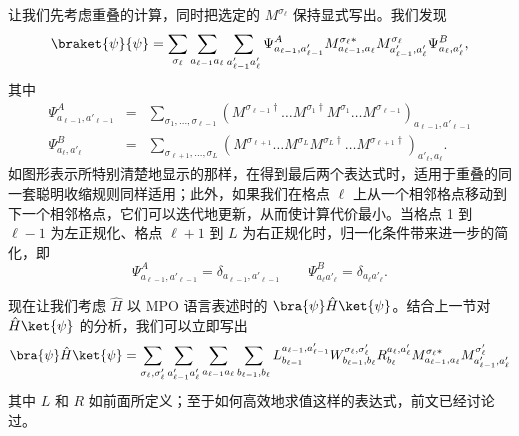 让我们先考虑重叠的计算，同时把选定的 $M^{\sigma_\ell}$ 保持显式写出。我们发现
\begin{equation}
\braket{\psi}{\psi} = \sum_{\sigma_\ell} \sum_{a_{\ell-1}a_{\ell}} \sum_{a'_{\ell-1}a'_{\ell}} \Psi^A_{a_{\ell-1},a'_{\ell-1}} M^{\sigma_\ell*}_{a_{\ell-1}, a_{\ell}} M^{\sigma_\ell}_{a'_{\ell-1}, a'_{\ell}} \Psi^B_{a_\ell, a_\ell'},
\end{equation}
其中
\begin{eqnarray}
\Psi^A_{a_{\ell-1},a'_{\ell-1}} &=& \sum_{\sigma_1,\ldots,\sigma_{\ell-1}} (M^{\sigma_{\ell-1}\dagger} \ldots M^{\sigma_1\dagger} M^{\sigma_1} \ldots M^{\sigma_{\ell-1}})_{a_{\ell-1},a'_{\ell-1}} \\
\Psi^B_{a_\ell, a'_\ell} &=& \sum_{\sigma_{\ell+1},\ldots,\sigma_L} (M^{\sigma_{\ell+1}} \ldots M^{\sigma_L} M^{\sigma_L\dagger} \ldots M^{\sigma_{\ell+1}\dagger})_{a'_\ell,a_\ell} .
\end{eqnarray}
如图形表示所特别清楚地显示的那样，在得到最后两个表达式时，适用于重叠的同一套聪明收缩规则同样适用；此外，如果我们在格点 $\ell$ 上从一个相邻格点移动到下一个相邻格点，它们可以迭代地更新，从而使计算代价最小。当格点 1 到 $\ell-1$ 为左正规化、格点 $\ell+1$ 到 $L$ 为右正规化时，归一化条件带来进一步的简化，即
\begin{equation} 
\Psi^A_{a_{\ell-1},a'_{\ell-1}} = \delta_{a_{\ell-1},a'_{\ell-1}} \quad\quad  \Psi^B_{a_\ell a'_\ell} = \delta_{a_\ell a'_\ell} .
\end{equation}

现在让我们考虑 $\hat{H}$ 以 MPO 语言表述时的 $\bra{\psi} \hat{H} \ket{\psi}$。结合上一节对 $\hat{H}\ket{\psi}$ 的分析，我们可以立即写出
\begin{equation}
\bra{\psi} \hat{H} \ket{\psi} = \sum_{\sigma_\ell,\sigma'_\ell} \sum_{a'_{\ell-1}a'_{\ell}}  \sum_{a_{\ell-1}a_{\ell}} \sum_{b_{\ell-1},b_\ell} L^{a_{\ell-1},a'_{\ell-1}}_{b_{\ell-1}} W^{\sigma_\ell,\sigma'_\ell}_{b_{\ell-1},b_\ell} R^{a_\ell,a'_\ell}_{b_\ell} M^{\sigma_\ell*}_{a_{\ell-1},a_\ell} M^{\sigma'_\ell}_{a'_{\ell-1},a'_\ell} 
\end{equation}
其中 $L$ 和 $R$ 如前面所定义；至于如何高效地求值这样的表达式，前文已经讨论过。

